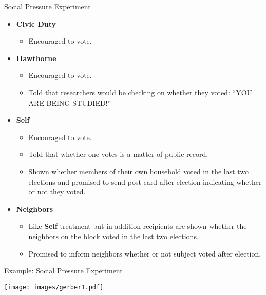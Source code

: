 \documentclass{beamer}
\numberwithin{equation}{section}
\begin{document}
\begin{frame}{Social Pressure Experiment}

\begin{itemize}
\itemsep1pt\parskip0pt
\item
  \textbf{Civic Duty}

  \begin{itemize}
  \itemsep1pt\parskip0pt
  \item
    Encouraged to vote.
  \end{itemize}
\item
  \textbf{Hawthorne}

  \begin{itemize}
  \itemsep1pt\parskip0pt
  \item
    Encouraged to vote.
  \item
    Told that researchers would be checking on whether they voted: ``YOU
    ARE BEING STUDIED!'' \pause
  \end{itemize}
\item
  \textbf{Self}

  \begin{itemize}
  \itemsep1pt\parskip0pt
  \item
    Encouraged to vote.
  \item
    Told that whether one votes is a matter of public record.
  \item
    Shown whether members of their own household voted in the last two
    elections and promised to send post-card after election indicating
    whether or not they voted. \pause
  \end{itemize}
\item
  \textbf{Neighbors}

  \begin{itemize}
  \itemsep1pt\parskip0pt
  \item
    Like \textbf{Self} treatment but in addition recipients are shown
    whether the neighbors on the block voted in the last two elections.
  \item
    Promised to inform neighbors whether or not subject voted after
    election.
  \end{itemize}
\end{itemize}

\end{frame}

\begin{frame}{Example: Social Pressure Experiment}

\centering
  \texttt{[image: images/gerber1.pdf]}

\end{frame}
\end{document}
